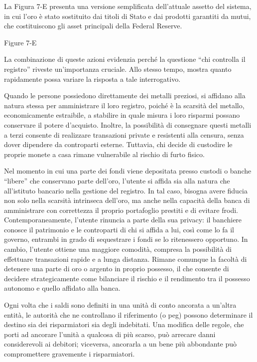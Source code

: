 \documentclass[
  a5paper,
  smalldemyvopaper,10pt,twoside,onecolumn,openright,extrafontsizes,hidelinks]{memoir}
\begin{document}
La Figura 7-E presenta una versione semplificata dell'attuale assetto
del sistema, in cui l'oro è stato sostituito dai titoli di Stato e dai
prodotti garantiti da mutui, che costituiscono gli asset principali
della Federal Reserve.

Figure 7-E

La combinazione di queste azioni evidenzia perché la questione ``chi
controlla il registro'' riveste un'importanza cruciale. Allo stesso
tempo, mostra quanto rapidamente possa variare la risposta a tale
interrogativo.

Quando le persone possiedono direttamente dei metalli preziosi, si
affidano alla natura stessa per amministrare il loro registro, poiché è
la scarsità del metallo, economicamente estraibile, a stabilire in quale
misura i loro risparmi possano conservare il potere d'acquisto. Inoltre,
la possibilità di consegnare questi metalli a terzi consente di
realizzare transazioni private e resistenti alla censura, senza dover
dipendere da controparti esterne. Tuttavia, chi decide di custodire le
proprie monete a casa rimane vulnerabile al rischio di furto fisico.

Nel momento in cui una parte dei fondi viene depositata presso custodi o
banche ``libere'' che conservano parte dell'oro, l'utente si affida sia
alla natura che all'istituto bancario nella gestione del registro. In
tal caso, bisogna avere fiducia non solo nella scarsità intrinseca
dell'oro, ma anche nella capacità della banca di amministrare con
correttezza il proprio portafoglio prestiti e di evitare frodi.
Contemporaneamente, l'utente rinuncia a parte della sua privacy: il
banchiere conosce il patrimonio e le controparti di chi si affida a lui,
così come lo fa il governo, entrambi in grado di sequestrare i fondi se
lo ritenessero opportuno. In cambio, l'utente ottiene una maggiore
comodità, compresa la possibilità di effettuare transazioni rapide e a
lunga distanza. Rimane comunque la facoltà di detenere una parte di oro
o argento in proprio possesso, il che consente di decidere
strategicamente come bilanciare il rischio e il rendimento tra il
possesso autonomo e quello affidato alla banca.

Ogni volta che i saldi sono definiti in una unità di conto ancorata a
un'altra entità, le autorità che ne controllano il riferimento (o peg)
possono determinare il destino sia dei risparmiatori sia degli
indebitati. Una modifica delle regole, che porti ad ancorare l'unità a
qualcosa di più scarso, può arrecare danni considerevoli ai debitori;
viceversa, ancorarla a un bene più abbondante può compromettere
gravemente i risparmiatori.
\end{document}
